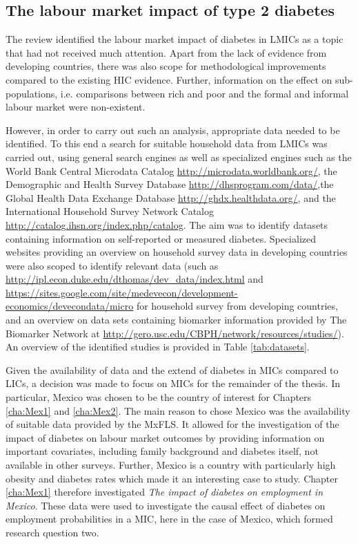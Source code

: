 \subsection{The labour market impact of type 2 diabetes}

The review identified the labour market impact of diabetes in \acp{LMIC} as a topic that had not received much attention. Apart from the lack of evidence from developing countries, there was also scope for methodological improvements compared to the existing \ac{HIC} evidence. Further, information on the effect on sub-populations, i.e. comparisons between rich and poor and the formal and informal labour market were non-existent.

However, in order to carry out such an analysis, appropriate data needed to be identified. To this end a search for suitable household data from \acp{LMIC} was carried out, using general search engines as well as specialized engines such as the World Bank Central Microdata Catalog  \url{http://microdata.worldbank.org/}, the Demographic and Health Survey Database \url{http://dhsprogram.com/data/},the Global Health Data Exchange Database \url{http://ghdx.healthdata.org/}, and the International Household Survey Network Catalog \url{http://catalog.ihsn.org/index.php/catalog}. The aim was to identify datasets containing information on self-reported or measured diabetes. Specialized websites providing an overview on household survey data in developing countries were also scoped to identify relevant data (such as \url{http://ipl.econ.duke.edu/dthomas/dev_data/index.html} and \url{https://sites.google.com/site/medevecon/development-economics/devecondata/micro} for household survey from developing countries, and an overview on data sets containing biomarker information provided by The Biomarker Network at \url{http://gero.usc.edu/CBPH/network/resources/studies/}). An overview of the identified studies is provided in Table \ref{tab:datasets}.

Given the availability of data and the extend of diabetes in \acp{MIC} compared to \acp{LIC}, a decision was made to focus on \acp{MIC} for the remainder of the thesis. In particular, Mexico was chosen to be the country of interest for Chapters \ref{cha:Mex1} and \ref{cha:Mex2}. The main reason to chose Mexico was the availability of suitable  data provided by the \ac{MxFLS}. It allowed for the investigation of the impact of diabetes on labour market outcomes by providing information on important covariates, including family background and diabetes itself, not available in other surveys. Further, Mexico is a country with particularly high obesity and diabetes rates which made it an interesting case to study. Chapter \ref{cha:Mex1} therefore investigated \textit{The impact of diabetes on employment in Mexico}. These data were used to investigate the causal effect of diabetes on employment probabilities in a \ac{MIC}, here in the case of Mexico, which formed research question two.

